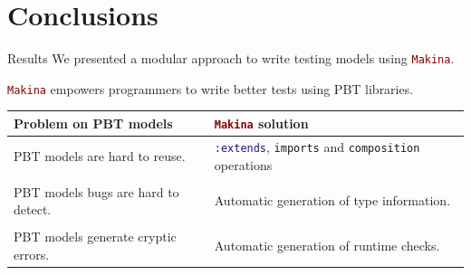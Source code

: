 \documentclass[aspectratio=169, 10pt, handout]{beamer}
\begin{document}
\section{Conclusions}
\label{sec:org391210c}
\begin{frame}[label={sec:org7580229},fragile]{Results}
 We presented a modular approach to write testing models using \lstinline[language=elixir, style=display]~Makina~.

\vspace{10pt}

\lstinline[language=elixir, style=display]~Makina~ empowers programmers to write better tests using PBT libraries.

\vspace{10pt}

\begin{center}
\begin{tabular}{ll}
Problem on PBT models & \lstinline[language=elixir, style=display]~Makina~ solution\\
\hline
PBT models are hard to reuse. & \lstinline[language=elixir, style=display]~:extends~, \lstinline[language=elixir, style=display]~imports~ and \lstinline[language=elixir, style=display]~composition~ operations\\
 & \\
PBT models bugs are hard to detect. & Automatic generation of type information.\\
 & \\
PBT models generate cryptic errors. & Automatic generation of runtime checks.\\
\end{tabular}
\end{center}
\end{frame}
\end{document}
